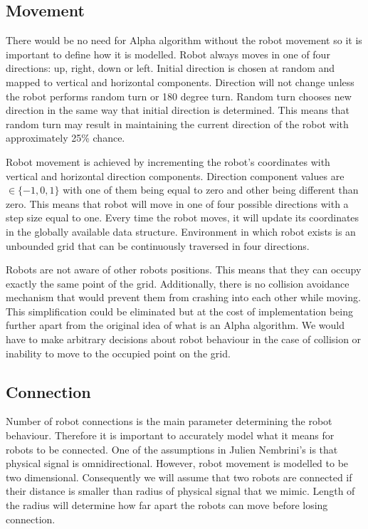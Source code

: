 \subsection{Movement}
There would be no need for Alpha algorithm without the robot movement so it is important to define how it is modelled. Robot always moves in one of four directions: up, right, down or left. Initial direction is chosen at random and mapped to vertical and horizontal components. Direction will not change unless the robot performs random turn or 180 degree turn. Random turn chooses new direction in the same way that initial direction is determined. This means that random turn may result in maintaining the current direction of the robot with approximately 25\% chance. 

Robot movement is achieved by incrementing the robot's coordinates with vertical and horizontal direction components. Direction component values are  $\in \{-1, 0, 1\}$ with one of them being equal to zero and other being different than zero. This means that robot will move in one of four possible directions with a step size equal to one. Every time the robot moves, it will update its coordinates in the globally available data structure. Environment in which robot exists is an unbounded grid that can be continuously traversed in four directions.

Robots are not aware of other robots positions. This means that they can occupy exactly the same point of the grid. Additionally, there is no collision avoidance mechanism that would prevent them from crashing into each other while moving. This simplification could be eliminated but at the cost of implementation being further apart from the original idea of what is an Alpha algorithm. We would have to make arbitrary decisions about robot behaviour in the case of collision or inability to move to the occupied point on the grid.

\subsection{Connection}
Number of robot connections is the main parameter determining the robot behaviour. Therefore it is important to accurately model what it means for robots to be connected. One of the assumptions in Julien Nembrini's \cite{Minimalist_Coherent_Swarming_of_Wireless_Networked_Autonomous_Mobile_Robots} is that physical signal is omnidirectional. However, robot movement is modelled to be two dimensional. Consequently we will assume that two robots are connected if their distance is smaller than radius of physical signal that we mimic. Length of the radius will determine how far apart the robots can move before losing connection.

